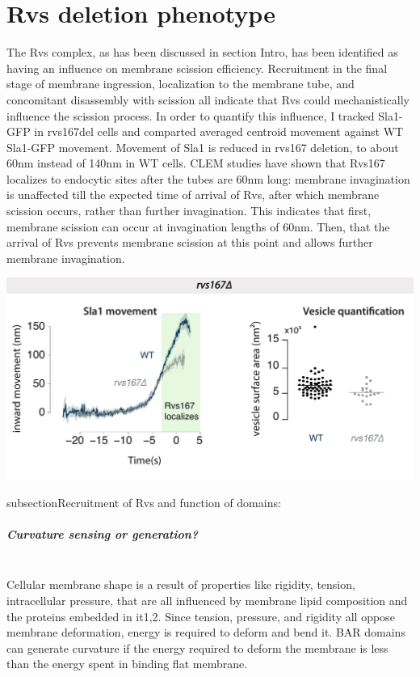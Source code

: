 \section{Rvs deletion phenotype}
The Rvs complex, as has been discussed in section {Intro}, has been identified as having an influence on membrane scission efficiency. Recruitment in the final stage of membrane ingression, localization to the membrane tube, and concomitant disassembly with scission all indicate that Rvs could mechanistically influence the scission process. In order to quantify this influence, I tracked Sla1-GFP in rvs167del cells and comparted averaged centroid movement against WT Sla1-GFP movement. Movement of Sla1 is reduced in rvs167 deletion, to about 60nm instead of 140nm in WT cells. CLEM studies have shown that Rvs167 localizes to endocytic sites after the tubes are 60nm long: membrane invagination is unaffected till the expected time of arrival of Rvs, after which membrane scission occurs, rather than further invagination. This indicates that first, membrane scission can occur at invagination lengths of 60nm. Then, that the arrival of Rvs prevents membrane scission at this point and allows further membrane invagination. 

\includegraphics{figures/results_final/rvsdeletion}

subsection{Recruitment of Rvs and function of domains: } 

	\subparagraph{Curvature sensing or generation? }
	\mbox{}\\
	Cellular membrane shape is a result of properties like rigidity, tension, intracellular pressure, that are all influenced by membrane lipid composition and the proteins embedded in it1,2. Since tension, pressure, and rigidity all oppose membrane deformation, energy is required to deform and bend it. BAR domains can generate curvature if the energy required to deform the membrane is less than the energy spent in binding flat membrane.

